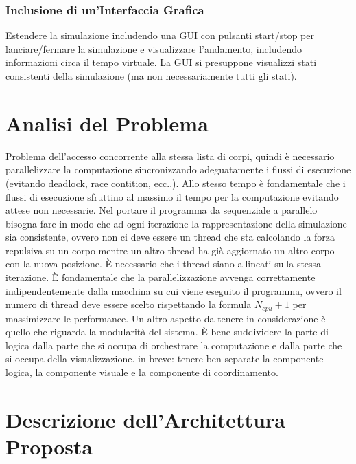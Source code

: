 \documentclass[12pt,a4paper,openright,twoside]{book}
\begin{document}
\subsection{Inclusione di un'Interfaccia Grafica}
Estendere la simulazione includendo una GUI con pulsanti start/stop per lanciare/fermare la simulazione e visualizzare l'andamento,
includendo informazioni circa il tempo virtuale.
La GUI si presuppone visualizzi stati consistenti della simulazione (ma non necessariamente tutti gli stati).
\chapter{Analisi del Problema}
\label{chap:Analisi del Problema}
Problema dell'accesso concorrente alla stessa lista di corpi, quindi è necessario parallelizzare la computazione
sincronizzando adeguatamente i flussi di esecuzione (evitando deadlock, race contition, ecc..).
Allo stesso tempo è fondamentale che i flussi di esecuzione sfruttino al massimo il tempo per la computazione evitando
attese non necessarie.
Nel portare il programma da sequenziale a parallelo bisogna fare in modo che ad ogni iterazione
la rappresentazione della simulazione sia consistente, ovvero non ci deve essere un thread che sta
calcolando la forza repulsiva su un corpo mentre un altro thread ha già aggiornato un altro corpo con la nuova posizione.
È necessario che i thread siano allineati sulla stessa iterazione.
È fondamentale che la parallelizzazione avvenga correttamente indipendentemente dalla macchina su
cui viene eseguito il programma, ovvero il numero di thread deve essere scelto rispettando la formula
$N_{cpu} + 1$ per massimizzare le performance.
Un altro aspetto da tenere in considerazione è quello che riguarda la modularità del sistema.
È bene suddividere la parte di logica dalla parte che si occupa di orchestrare la computazione
e dalla parte che si occupa della visualizzazione. in breve: tenere ben separate la componente logica,
la componente visuale e la componente di coordinamento.

\chapter{Descrizione dell'Architettura Proposta} %
\label{chap:Descrizione dell'Architettura Proposta}
\end{document}

